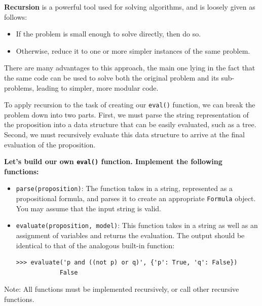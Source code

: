 \documentclass{article}
\begin{document}
    \vspace{2mm}
    \textbf{Recursion} is a powerful tool used for solving algorithms, and is loosely given as follows:
    \begin{itemize}
        \item If the problem is small enough to solve directly, then do so.
        \item Otherwise, reduce it to one or more simpler instances of the same problem.
    \end{itemize}
    There are many advantages to this approach, the main one lying in the fact that the same code can be used to solve both the original problem and its sub-problems, leading to simpler, more modular code.

    \vspace{2mm}
    To apply recursion to the task of creating our \lstinline+eval()+ function, we can break the problem down into two parts. First, we must parse the string representation of the proposition into a data structure that can be easily evaluated, such as a tree. Second, we must recursively evaluate this data structure to arrive at the final evaluation of the proposition.

    

\begin{tcolorbox}[enhanced,interior style={top color=Dandelion!20,bottom color=Dandelion!30}]
    \textbf{Let's build our own \lstinline{eval()} function. Implement the following functions:}
    \begin{itemize}
        \item \lstinline{parse(proposition)}: The function takes in a string, represented as a propositional formula, and parses it to create an appropriate \lstinline{Formula} object. You may assume that the input string is valid.
        \item \lstinline{evaluate(proposition, model)}: This function takes in a string as well as an assignment of variables and returns the evaluation. The output should be identical to that of the analogous built-in function:
        \begin{lstlisting}[belowskip=-10pt]
            >>> evaluate('p and ((not p) or q)', {'p': True, 'q': False})
            False
        \end{lstlisting}
    \end{itemize}

    Note: All functions must be implemented recursively, or call other recursive functions.
\end{tcolorbox}
\end{document}
